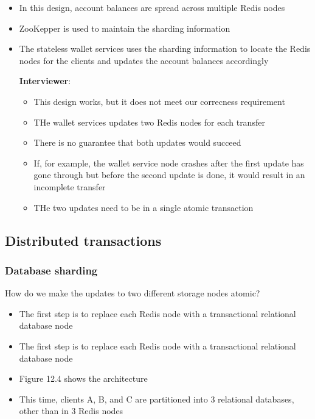 \documentclass{report}
\theoremstyle{definition}
\let\oldsubsection\subsection
\let\oldsubsubsection\subsubsection
\renewcommand{\subsection}{\oldsubsection*}
\renewcommand{\subsubsection}{\oldsubsubsection*}
\begin{document}
\begin{itemize}
\item
In this design, account balances are spread across multiple Redis nodes
\item
ZooKepper is used to maintain the sharding information
\item
The stateless wallet services uses the sharding information to locate the Redis nodes for the clients and updates the account balances accordingly

\textbf{Interviewer}:

\begin{itemize}
\item
This design works, but it does not meet our correcness requirement
\item
THe wallet services updates two Redis nodes for each transfer
\item
There is no guarantee that both updates would succeed
\item
If, for example, the wallet service node crashes after the first update has gone through but before the second update is done, it would result in an incomplete transfer
\item
THe two updates need to be in a single atomic transaction
\end{itemize}
\end{itemize}

\subsection{Distributed transactions}

\subsubsection{Database sharding}

How do we make the updates to two different storage nodes atomic?

\begin{itemize}
\item
The first step is to replace each Redis node with a transactional relational database node
\item
The first step is to replace each Redis node with a transactional relational database node
\item
Figure 12.4 shows the architecture
\item
This time, clients A, B, and C are partitioned into 3 relational databases, other than in 3 Redis nodes
\end{itemize}
\end{document}
